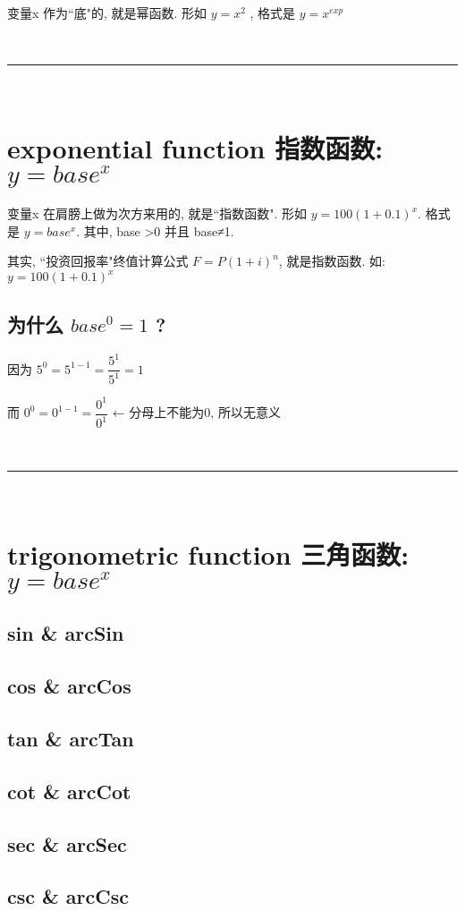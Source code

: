 \documentclass[UTF8]{ctexart}
\begin{document}
变量x 作为``底"的, 就是幂函数. 形如 $ y=x^2 $ , 格式是 $ y = x^{exp} $


~\\
\hrule
~\\


\section{exponential function 指数函数:  $ y=base^x $}

变量x 在肩膀上做为次方来用的, 就是``指数函数". 形如 $ y=100(1+0.1)^x $. 格式是   $ y=base^x $. 其中, base \textgreater 0 并且 base≠1.

其实, ``投资回报率"终值计算公式 $ F=P(1+i)^n $, 就是指数函数. 如: $ y=100(1+0.1)^x $ 


\subsection{为什么 $base^0=1$ ?}

因为 $ 5^0 =5^{1-1}=\dfrac{5^1} {5^1} =1$

而 $ 0^0 =0^{1-1}=\dfrac{0^1} {0^1} $ ← 分母上不能为0, 所以无意义


~\\
\hrule
~\\


\section{trigonometric function 三角函数:  $ y=base^x $}

\subsection{sin \& arcSin}





\subsection{cos \& arcCos}



\subsection{tan \& arcTan}




\subsection{cot \& arcCot}




\subsection{sec \& arcSec}




\subsection{csc \& arcCsc}
\end{document}
